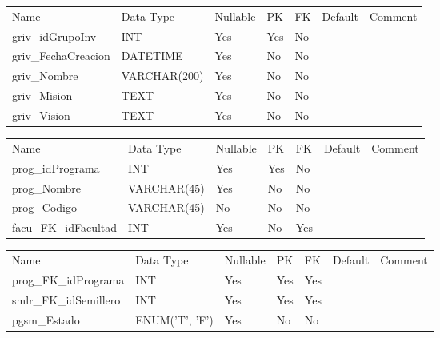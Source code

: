 			\begin{center}
				\begin{tabular}{ |l|l|l|l|l|l|l| }
					\hline
					Name & Data Type & Nullable & PK & FK & Default & Comment \\
					griv_idGrupoInv & INT & Yes & Yes & No &  & \\ \hline 
griv_FechaCreacion & DATETIME & Yes & No & No &  & \\ \hline 
griv_Nombre & VARCHAR(200) & Yes & No & No &  & \\ \hline 
griv_Mision & TEXT & Yes & No & No &  & \\ \hline 
griv_Vision & TEXT & Yes & No & No &  & \\ \hline 

				\end{tabular}
			\end{center}
		

			\begin{center}
				\begin{tabular}{ |l|l|l|l|l|l|l| }
					\hline
					Name & Data Type & Nullable & PK & FK & Default & Comment \\
					prog_idPrograma & INT & Yes & Yes & No &  & \\ \hline 
prog_Nombre & VARCHAR(45) & Yes & No & No &  & \\ \hline 
prog_Codigo & VARCHAR(45) & No & No & No &  & \\ \hline 
facu_FK_idFacultad & INT & Yes & No & Yes &  & \\ \hline 

				\end{tabular}
			\end{center}
		

			\begin{center}
				\begin{tabular}{ |l|l|l|l|l|l|l| }
					\hline
					Name & Data Type & Nullable & PK & FK & Default & Comment \\
					prog_FK_idPrograma & INT & Yes & Yes & Yes &  & \\ \hline 
smlr_FK_idSemillero & INT & Yes & Yes & Yes &  & \\ \hline 
pgsm_Estado & ENUM('T', 'F') & Yes & No & No &  & \\ \hline 

				\end{tabular}
			\end{center}
		

